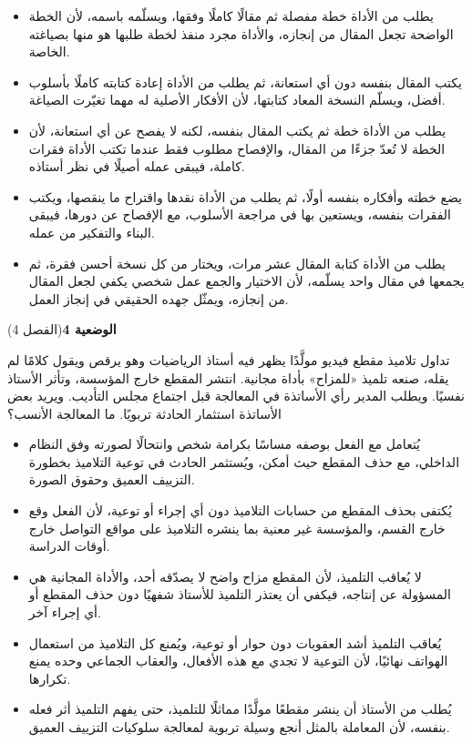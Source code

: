 \documentclass[11pt,a4paper]{article}
\begin{document}
\begin{itemize}[leftmargin=1.0cm, labelsep=6pt, itemsep=3pt, topsep=4pt, parsep=0pt]
  \item[\textbf{أ)}] يطلب من الأداة خطة مفصلة ثم مقالًا كاملًا وفقها، ويسلّمه باسمه، لأن الخطة الواضحة تجعل المقال من إنجازه، والأداة مجرد منفذ لخطة طلبها هو منها بصياغته الخاصة.
  \item[\textbf{ب)}] يكتب المقال بنفسه دون أي استعانة، ثم يطلب من الأداة إعادة كتابته كاملًا بأسلوب أفضل، ويسلّم النسخة المعاد كتابتها، لأن الأفكار الأصلية له مهما تغيّرت الصياغة.
  \item[\textbf{ج)}] يطلب من الأداة خطة ثم يكتب المقال بنفسه، لكنه لا يفصح عن أي استعانة، لأن الخطة لا تُعدّ جزءًا من المقال، والإفصاح مطلوب فقط عندما تكتب الأداة فقرات كاملة، فيبقى عمله أصيلًا في نظر أستاذه.
  \item[\textbf{د)}] يضع خطته وأفكاره بنفسه أولًا، ثم يطلب من الأداة نقدها واقتراح ما ينقصها، ويكتب الفقرات بنفسه، ويستعين بها في مراجعة الأسلوب، مع الإفصاح عن دورها، فيبقى البناء والتفكير من عمله.
  \item[\textbf{هـ)}] يطلب من الأداة كتابة المقال عشر مرات، ويختار من كل نسخة أحسن فقرة، ثم يجمعها في مقال واحد يسلّمه، لأن الاختيار والجمع عمل شخصي يكفي لجعل المقال من إنجازه، ويمثّل جهده الحقيقي في إنجاز العمل.
\end{itemize}
\par\vspace{6pt}
\noindent
{\large\khatt\textbf{الوضعية 4}}\hfill{\small(الفصل 4)}\par\nopagebreak\vspace{3pt}
\setlength{\fboxsep}{7pt}\colorbox{gray!10}{\parbox{\dimexpr\linewidth-14pt}{تداول تلاميذ مقطع فيديو مولَّدًا يظهر فيه أستاذ الرياضيات وهو يرقص ويقول كلامًا لم يقله، صنعه تلميذ «للمزاح» بأداة مجانية. انتشر المقطع خارج المؤسسة، وتأثر الأستاذ نفسيًا. ويطلب المدير رأي الأساتذة في المعالجة قبل اجتماع مجلس التأديب. ويريد بعض الأساتذة استثمار الحادثة تربويًا. ما المعالجة الأنسب؟}}\par\nopagebreak
\begin{itemize}[leftmargin=1.0cm, labelsep=6pt, itemsep=3pt, topsep=4pt, parsep=0pt]
  \item[\textbf{أ)}] يُتعامل مع الفعل بوصفه مساسًا بكرامة شخص وانتحالًا لصورته وفق النظام الداخلي، مع حذف المقطع حيث أمكن، ويُستثمر الحادث في توعية التلاميذ بخطورة التزييف العميق وحقوق الصورة.
  \item[\textbf{ب)}] يُكتفى بحذف المقطع من حسابات التلاميذ دون أي إجراء أو توعية، لأن الفعل وقع خارج القسم، والمؤسسة غير معنية بما ينشره التلاميذ على مواقع التواصل خارج أوقات الدراسة.
  \item[\textbf{ج)}] لا يُعاقب التلميذ، لأن المقطع مزاح واضح لا يصدّقه أحد، والأداة المجانية هي المسؤولة عن إنتاجه، فيكفي أن يعتذر التلميذ للأستاذ شفهيًا دون حذف المقطع أو أي إجراء آخر.
  \item[\textbf{د)}] يُعاقب التلميذ أشد العقوبات دون حوار أو توعية، ويُمنع كل التلاميذ من استعمال الهواتف نهائيًا، لأن التوعية لا تجدي مع هذه الأفعال، والعقاب الجماعي وحده يمنع تكرارها.
  \item[\textbf{هـ)}] يُطلب من الأستاذ أن ينشر مقطعًا مولَّدًا مماثلًا للتلميذ، حتى يفهم التلميذ أثر فعله بنفسه، لأن المعاملة بالمثل أنجع وسيلة تربوية لمعالجة سلوكيات التزييف العميق.
\end{itemize}
\end{document}
